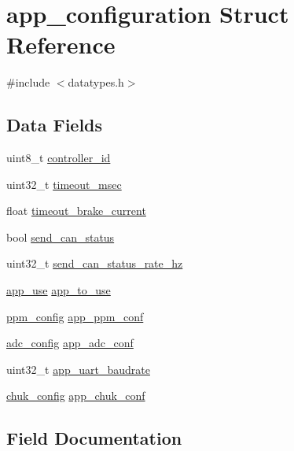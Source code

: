 \hypertarget{structapp__configuration}{}\section{app\+\_\+configuration Struct Reference}
\label{structapp__configuration}


{\ttfamily \#include $<$datatypes.\+h$>$}

\subsection*{Data Fields}
\begin{DoxyCompactItemize}
\item 
uint8\+\_\+t \hyperlink{structapp__configuration_a717df0c5daa0a9d46bb055c05a3f7f8d}{controller\+\_\+id}
\item 
uint32\+\_\+t \hyperlink{structapp__configuration_a683fbd7162eec3313289bc266a921260}{timeout\+\_\+msec}
\item 
float \hyperlink{structapp__configuration_a9181ad14758fc2144ab3fa47b6018f43}{timeout\+\_\+brake\+\_\+current}
\item 
bool \hyperlink{structapp__configuration_a836945654c96862d15e0d6c60c386524}{send\+\_\+can\+\_\+status}
\item 
uint32\+\_\+t \hyperlink{structapp__configuration_ab07c6709ecea9b0050dc9715a9b6691c}{send\+\_\+can\+\_\+status\+\_\+rate\+\_\+hz}
\item 
\hyperlink{datatypes_8h_a8b0985db03d6f1c46c55807b43b50ed9}{app\+\_\+use} \hyperlink{structapp__configuration_ad0e21afe6190d34ff0949ab4afd2f282}{app\+\_\+to\+\_\+use}
\item 
\hyperlink{structppm__config}{ppm\+\_\+config} \hyperlink{structapp__configuration_ae1fcb181f036475af4fcc877c0573405}{app\+\_\+ppm\+\_\+conf}
\item 
\hyperlink{structadc__config}{adc\+\_\+config} \hyperlink{structapp__configuration_aeca087607cd92575d2d8d235537e1e3f}{app\+\_\+adc\+\_\+conf}
\item 
uint32\+\_\+t \hyperlink{structapp__configuration_a28607a6f6405f9f63e1d9821795a9050}{app\+\_\+uart\+\_\+baudrate}
\item 
\hyperlink{structchuk__config}{chuk\+\_\+config} \hyperlink{structapp__configuration_ac8ffe30321ad64ca1cf0e404f7b70c29}{app\+\_\+chuk\+\_\+conf}
\end{DoxyCompactItemize}


\subsection{Field Documentation}
\hypertarget{structapp__configuration_aeca087607cd92575d2d8d235537e1e3f}{}
